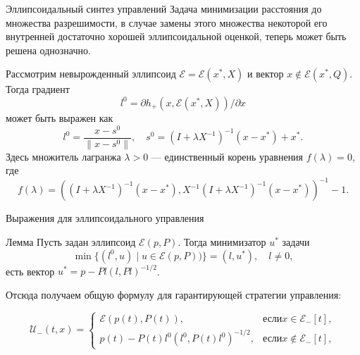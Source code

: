 \documentclass{beamer}
\begin{document}
\begin{frame}{Эллипсоидальный синтез управлений}
    Задача минимизации расстояния до множества разрешимости, в случае замены этого множества некоторой его внутренней достаточно хорошей эллипсоидальной оценкой, теперь может быть решена однозначно.

    Рассмотрим невырожденный эллипсоид \( \mathcal{E} = \mathcal{E}(x^*, X) \) и вектор \( x \notin 
     \mathcal{E}(x^*, Q). \) Тогда градиент
    \begin{equation*}
        l^0 = \partial h_+(x, \mathcal{E}(x^*, X)) / \partial x
    \end{equation*}
    может быть выражен как 
    \begin{equation*}
        l^0 = \frac{x - s^0}{\| x - s^0 \|}, \quad s^0 = (I + \lambda X^{-1})^{-1}(x - x^*) + x^*.
    \end{equation*}
    Здесь множитель лагранжа \( \lambda > 0 \) --- единственный корень уравнения \( f(\lambda) = 0 \),
    где
    \begin{equation*}
        f(\lambda) = ((I + \lambda X^{-1})^{-1}(x - x^*), X^{-1}(I + \lambda X^{-1})^{-1}(x - x^*))^{-1} - 1.
    \end{equation*}

\end{frame}

\begin{frame}{Выражения для эллипсоидального управления}
\begin{block}{Лемма}
    Пусть задан эллипсоид \( \mathcal{E}(p, P) \). Тогда минимизатор \( u^* \) задачи
    \begin{equation*}
        \min\{ (l^0, u) \mid u \in \mathcal{E}(p, P)) \} = (l, u^*), \quad l \ne 0, 
    \end{equation*}
    есть вектор \( u^* = p - Pl(l, Pl)^{-1/2} \).
\end{block}
Отсюда получаем общую формулу для гарантирующей стратегии управления:

\begin{equation*}
    \mathcal{U}_-(t,x) = 
     \begin{cases}
        \mathcal{E}(p(t), P(t)), & \text{если} x \in \mathcal{E}_-[t], \\
        p(t) - P(t)l^0(l^0, P(t)l^0)^{-1/2}, & \text{если} x \notin \mathcal{E}_-[t],
     \end{cases}
\end{equation*}

\end{frame}
\end{document}
